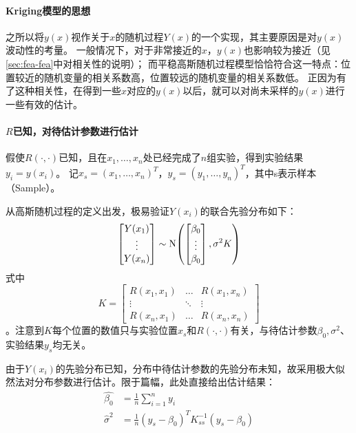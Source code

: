 \documentclass[index]{subfiles}
\begin{document}
\paragraph{Kriging模型的思想}
之所以将$y(x)$视作关于$x$的随机过程$Y(x)$的一个实现，其主要原因是对$y(x)$波动性的考量。
一般情况下，对于非常接近的$x$，$y(x)$也影响较为接近（见\cref{sec:fea-fea}中对相关性的说明）；
而平稳高斯随机过程模型恰恰符合这一特点：位置较近的随机变量的相关系数高，位置较远的随机变量的相关系数低。
正因为有了这种相关性，在得到一些$x$对应的$y(x)$以后，就可以对尚未采样的$y(x)$进行一些有效的估计。

\paragraph{$R$已知，对待估计参数进行估计}
假使$R(\cdot, \cdot)$已知，且在$x_1,\ldots,x_n$处已经完成了$n$组实验，得到实验结果$y_i=y(x_i)$。
记$x_s=(x_1,\ldots,x_n)^T$，$y_s=(y_1,\ldots,y_n)^{T}$，其中s表示样本（Sample）。

从高斯随机过程的定义出发，极易验证$Y(x_i)$的联合先验分布如下：
\begin{equation}\label{equ:doe-kss-d}
  \begin{bmatrix} Y(x_1) \\ \vdots \\ Y(x_n) \end{bmatrix}
  \sim \Normal{
    \begin{bmatrix} \beta_0 \\ \vdots \\ \beta_0 \end{bmatrix}
  }{\sigma^2 K }
\end{equation}
式中
\begin{equation}\label{equ:doe-kss}
  K = \begin{bmatrix}
    R(x_1, x_1) & \ldots & R(x_1, x_n) \\
    \vdots & \ddots & \vdots \\
    R(x_n, x_1) & \ldots & R(x_n, x_n)
  \end{bmatrix}
\end{equation}
。注意到$K$每个位置的数值只与实验位置$x_s$和$R(\cdot, \cdot)$有关，与待估计参数$\beta_0,\sigma^2$、实验结果$y_s$均无关。

由于$Y(x_i)$的先验分布已知，分布中待估计参数的先验分布未知，故采用极大似然法对分布参数进行估计。限于篇幅，此处直接给出估计结果\cite{sacks1989}：
\begin{align}\label{equ:doe-par-est}
  \hat{\beta_0} &= \frac{1}{n} \sum_{i=1}^{n} y_i \\
  \hat{\sigma}^2 &= \frac{1}{n} (y_s - \beta_0)^T K_{ss}^{-1} (y_s - \beta_0)
\end{align}
\end{document}
